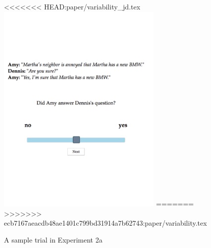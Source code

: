 \documentclass[11pt,fleqn]{article}
\newcommand{\6}{\mbox{$[\hspace*{-.6mm}[$}}
\newcommand{\9}{\mbox{$]\hspace*{-.6mm}]$}}
\begin{document}
\begin{figure}[!h]
\begin{center}
<<<<<<< HEAD:paper/variability_jd.tex
\includegraphics[width=8cm]{figures/exp2-trial}
=======
>>>>>>> ecb7167aeacdb48ae1401c799bd31914a7b62743:paper/variability.tex
\end{center}
\caption{A sample trial in Experiment 2a}\label{f-trial-exp2a}
\end{figure}
\end{document}
